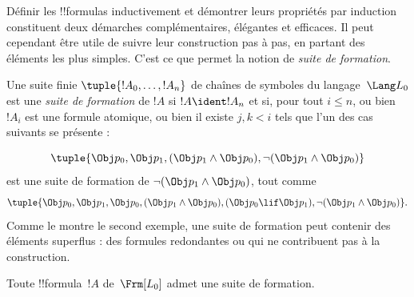 \documentclass[../../../include/open-logic-section]{subfiles}
\begin{document}


Définir les !!{formula}s inductivement et démontrer leurs propriétés
par induction constituent deux démarches complémentaires, élégantes
et efficaces. Il peut cependant être utile de suivre leur construction
pas à pas, en partant des éléments les plus simples. C'est ce que
permet la notion de \emph{suite de formation}.

\begin{defn}
Une suite finie $\tuple{!A_0,\dotsc,!A_n}$ de chaînes de symboles
du langage~$\Lang L_0$ est une \emph{suite de formation} de $!A$ si
$!A \ident !A_n$ et si, pour tout $i \leq n$, ou bien $!A_i$ est
une formule atomique, ou bien il existe $j,k < i$ tels que l'un
des cas suivants se présente :
\begin{enumerate}
\end{enumerate}
\end{defn}

\begin{ex}
\[
\tuple{
    \Obj p_0,
    \Obj p_1,
    (\Obj p_1 \land \Obj p_0),
    \lnot (\Obj p_1 \land \Obj p_0)
}
\]
est une suite de formation de
$\lnot (\Obj p_1 \land \Obj p_0)$, tout comme
\[
\tuple{
    \Obj p_0,
    \Obj p_1,
    \Obj p_0,
    (\Obj p_1 \land \Obj p_0),
    (\Obj p_0 \lif \Obj p_1),
    \lnot (\Obj p_1 \land \Obj p_0)
}.
\]
%
Comme le montre le second exemple, une suite de formation peut
contenir des éléments superflus : des formules redondantes ou
qui ne contribuent pas à la construction.
\end{ex}

\begin{prop}
Toute !!{formula}~$!A$ de~$\Frm[L_0]$ admet une suite de formation.
\end{prop}
\end{document}
